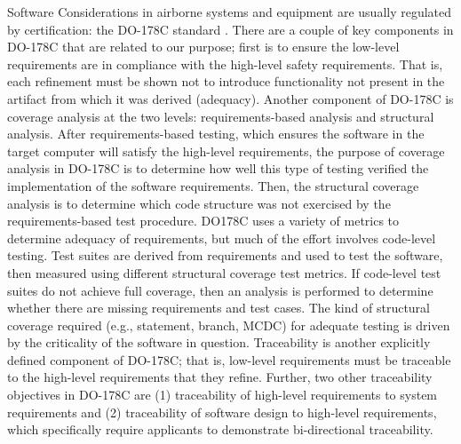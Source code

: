 Software Considerations in airborne systems and equipment are usually regulated by certification: the DO-178C standard \cite{DO178C}.   There are a couple of key components in DO-178C that are related to our purpose; first is to ensure the low-level requirements are in compliance with the high-level safety requirements. That is, each refinement must be shown not to introduce functionality not present in the artifact from which it was derived (adequacy).
Another component of DO-178C is coverage analysis at the two levels: requirements-based analysis and structural analysis.
After requirements-based testing, which ensures the software in the target computer will satisfy the high-level requirements, the purpose of coverage analysis in DO-178C is to determine how well this type of testing verified the implementation of the software requirements. Then, the structural coverage analysis is to determine which code structure was not exercised by the requirements-based test procedure.
DO178C  uses a variety of metrics to determine adequacy of requirements, but much of the effort involves code-level testing.  Test suites are derived from requirements and used to test the software, then measured using different structural coverage test metrics.
If code-level test suites do not achieve full coverage, then an analysis is performed to determine whether there are missing requirements and test cases.  The kind of structural coverage required (e.g., statement, branch, MCDC) for adequate testing is driven by the criticality of the software in question.
Traceability is another explicitly defined component of DO-178C; that is, low-level requirements must be traceable to the high-level requirements that they refine. Further, two other traceability objectives in DO-178C are (1) traceability of high-level requirements to system requirements and (2) traceability of software design to high-level requirements, which specifically require applicants to demonstrate bi-directional traceability.


